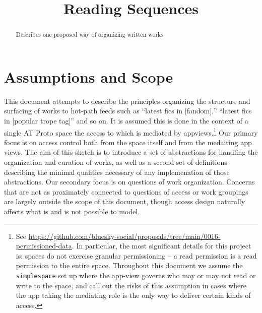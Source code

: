 \documentclass{amsart}
\title{Reading Sequences}
\theoremstyle{remark}
\begin{document}
\maketitle
\begin{abstract}
Describes one proposed way of organizing written works 
\end{abstract}

\section{Assumptions and Scope}
This document attempts to describe the principles organizing the structure and surfacing of works to hot-path feeds such as ``latest fics in [fandom],'' ``latest fics in [popular trope tag]'' and so on. It is assumed this is done in the context of a single AT Proto space the access to which is mediated by appviews.\footnote{See \url{https://github.com/bluesky-social/proposals/tree/main/0016-permissioned-data}. In particular, the most significant details for this project is: spaces do not exercise granular permissioning -- a read permission is a read permission to the entire space. Throughout this document we assume the \texttt{simplespace} set up where the app-view governs who may or may not read or write to the space, and call out the risks of this assumption in cases where the app taking the mediating role is the only way to deliver certain kinds of access.}  Our primary focus is on access control both from the space itself and from the medaiting app views. The aim of this sketch is to introduce a set of abstractions for handling the organization and curation of works, as well as a second set of definitions describing the minimal qualities necessary of any implemenation of those abstractions. Our secondary focus is on questions of work organization. Concerns that are not as proximately connected to questions of access or work groupings are largely outside the scope of this document, though access design naturally affects what is and is not possible to model. 
\end{document}
